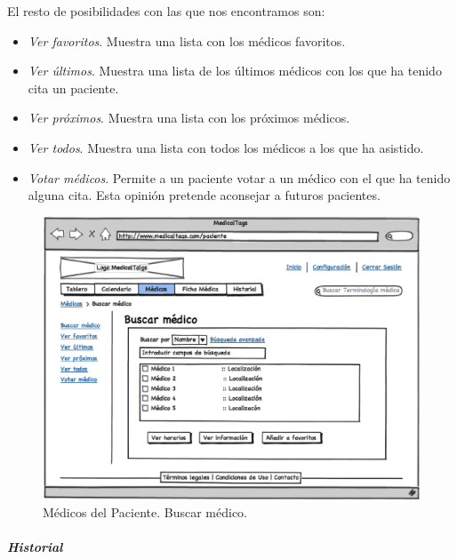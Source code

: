 			
			El resto de posibilidades con las que nos encontramos son:
			\begin{itemize}
				\item \textit{Ver favoritos}. Muestra una lista con los médicos favoritos.
				\item \textit{Ver últimos}. Muestra una lista de los últimos médicos con los que ha tenido cita un paciente.
				\item \textit{Ver próximos}. Muestra una lista con los próximos médicos.
				\item \textit{Ver todos}. Muestra una lista con todos los médicos a los que ha asistido.
				\item \textit{Votar médicos}. Permite a un paciente votar a un médico con el que ha tenido alguna cita. Esta opinión pretende aconsejar a futuros pacientes.
			\end{itemize}
		
		
			\begin{figure}[H]
			  \centering
			    \includegraphics[width=12cm]{img/eps/28_Medicos_Paciente.eps}
			  \caption{Médicos del Paciente. Buscar médico.}
			  \label{fig:medico_paciente_buscar}
			\end{figure}
		
		
		\subparagraph{Historial} %
		\label{par:paciente_historial}
		

